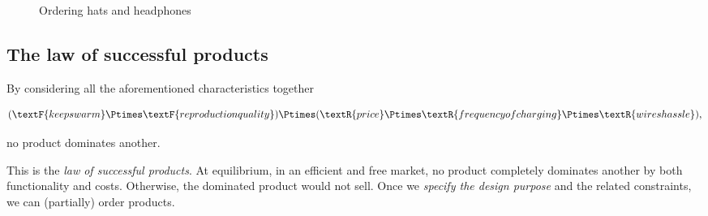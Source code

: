 \begin{figure*}[h]
    \caption{Ordering hats and headphones}
\end{figure*}



\subsection{The law of successful products}
By considering all the aforementioned characteristics together
\begin{widepar}
    \begin{equation}\label{eq:all-functionality}
        (\textF{keeps warm}\Ptimes \textF{reproduction quality})
        \Ptimes (\textR{price}\Ptimes \textR{frequency of charging}\Ptimes \textR{wires hassle}),
    \end{equation}
\end{widepar}
no product dominates another.

This is the \emph{law of successful products}.
At equilibrium, in an efficient and free market, no product completely dominates another by both functionality and costs.
Otherwise, the dominated product would not sell.
Once we \emph{specify the design purpose} and the related constraints, we can (partially) order products.

